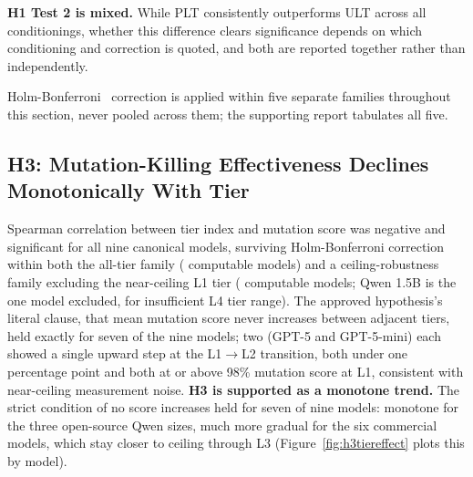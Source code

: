 \textbf{H1 Test 2 is mixed.} While PLT consistently outperforms ULT across all conditionings, whether this difference clears significance depends on which conditioning and correction is quoted, and both are reported together rather than independently.

Holm-Bonferroni~\cite{holm1979simple} correction is applied within five separate families throughout this section, never pooled across them; the supporting report tabulates all five.

\subsection{H3: Mutation-Killing Effectiveness Declines Monotonically With Tier}
\label{sec:results-h3}
Spearman correlation between tier index and mutation score was negative and significant for all nine canonical models, surviving Holm-Bonferroni correction within both the all-tier family (\HThreeAllTierSig{} computable models) and a ceiling-robustness family excluding the near-ceiling L1 tier (\HThreeLTwoLFourSig{} computable models; Qwen 1.5B is the one model excluded, for insufficient L4 tier range). The approved hypothesis's literal clause, that mean mutation score never increases between adjacent tiers, held exactly for seven of the nine models; two (GPT-5 and GPT-5-mini) each showed a single upward step at the L1$\rightarrow$L2 transition, both under one percentage point and both at or above 98\% mutation score at L1, consistent with near-ceiling measurement noise. \textbf{H3 is supported as a monotone trend.} The strict condition of no score increases held for seven of nine models: monotone for the three open-source Qwen sizes, much more gradual for the six commercial models, which stay closer to ceiling through L3 (Figure~\ref{fig:h3tiereffect} plots this by model). %

